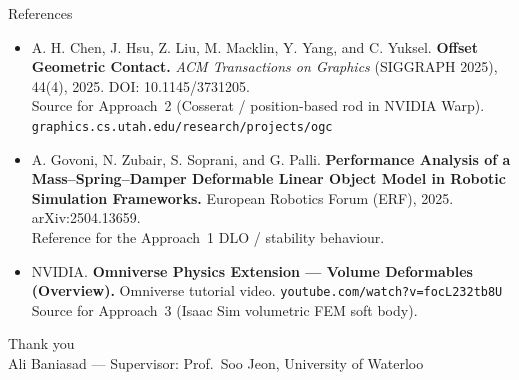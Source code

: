 \documentclass[aspectratio=169]{beamer}
\begin{document}
\begin{frame}{References}
  \footnotesize
  \begin{itemize}\itemsep4pt
    \item[{[1]}] A. H. Chen, J. Hsu, Z. Liu, M. Macklin, Y. Yang, and C. Yuksel.
          \textbf{Offset Geometric Contact.}
          \emph{ACM Transactions on Graphics} (SIGGRAPH 2025), 44(4), 2025.
          DOI: 10.1145/3731205. \\
          {\scriptsize Source for Approach~2 (Cosserat / position-based rod in NVIDIA Warp).
           \texttt{graphics.cs.utah.edu/research/projects/ogc}}
    \item[{[2]}] A. Govoni, N. Zubair, S. Soprani, and G. Palli.
          \textbf{Performance Analysis of a Mass--Spring--Damper Deformable Linear
          Object Model in Robotic Simulation Frameworks.}
          European Robotics Forum (ERF), 2025. arXiv:2504.13659. \\
          {\scriptsize Reference for the Approach~1 DLO / stability behaviour.}
    \item[{[3]}] NVIDIA. \textbf{Omniverse Physics Extension --- Volume Deformables (Overview).}
          Omniverse tutorial video. \texttt{youtube.com/watch?v=focL232tb8U} \\
          {\scriptsize Source for Approach~3 (Isaac Sim volumetric FEM soft body).}
  \end{itemize}
\end{frame}

\begin{frame}[plain]
  \centering\vfill
  {\Large Thank you}\\[3em]
  {\footnotesize Ali Baniasad --- Supervisor: Prof.\ Soo Jeon, University of Waterloo}
  \vfill
\end{frame}
\end{document}

